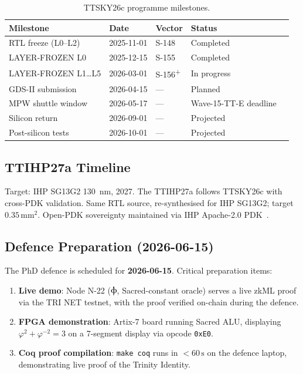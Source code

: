 \begin{table}[h]
\centering
\caption{TTSKY26c programme milestones.}
\label{tab:ttsky26c}
\begin{tabular}{lllll}
\hline
Milestone & Date & Vector & Status \\
\hline
RTL freeze (L0--L2) & 2025-11-01 & S-148 & Completed \\
LAYER-FROZEN L0 & 2025-12-15 & S-155 & Completed \\
LAYER-FROZEN L1\ldots L5 & 2026-03-01 & S-156\textsuperscript{+} & In progress \\
GDS-II submission & 2026-04-15 & — & Planned \\
MPW shuttle window & 2026-05-17 & — & Wave-15-TT-E deadline \\
Silicon return & 2026-09-01 & — & Projected \\
Post-silicon tests & 2026-10-01 & — & Projected \\
\hline
\end{tabular}
\end{table}

\subsection{TTIHP27a Timeline}

Target: IHP SG13G2 130~nm, 2027.
The TTIHP27a follows TTSKY26c with cross-PDK validation.
Same RTL source, re-synthesised for IHP SG13G2; target \(0.35\,\text{mm}^2\).
Open-PDK sovereignty maintained via IHP Apache-2.0 PDK~\cite{sauter2025croc}.

\subsection{Defence Preparation (2026-06-15)}

The PhD defence is scheduled for \textbf{2026-06-15}.
Critical preparation items:
\begin{enumerate}
  \item \textbf{Live demo}: Node N-22 (Ⲫ, Sacred-constant oracle) serves a
        live zkML proof via the TRI NET testnet, with the proof verified on-chain
        during the defence.
  \item \textbf{FPGA demonstration}: Artix-7 board running Sacred ALU,
        displaying \(\varphi^2 + \varphi^{-2} = 3\) on a 7-segment display via
        opcode \texttt{0xE0}.
  \item \textbf{Coq proof compilation}: \texttt{make coq} runs in
        \(<60\,\text{s}\) on the defence laptop, demonstrating live proof of the
        Trinity Identity.
\end{enumerate}

